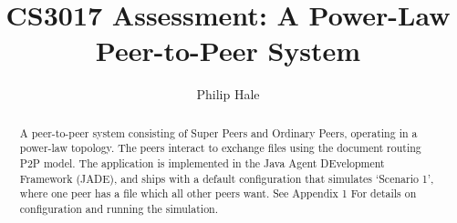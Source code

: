 \documentclass[a4paper,oneside]{article}
\author{Philip Hale}
\title{CS3017 Assessment: A Power-Law Peer-to-Peer System}
\begin{document}
\begin{titlepage}
  \maketitle
  \begin{abstract}
  A peer-to-peer system consisting of Super Peers and Ordinary Peers, operating
  in a power-law topology. The peers interact to exchange files using the
  document routing P2P model. The application is implemented in the Java Agent
  DEvelopment Framework (JADE), and ships with a default configuration that
  simulates `Scenario 1', where one peer has a file which all other peers want.
  See Appendix 1 For details on configuration and running the simulation.
  \end{abstract}
  \dosecttoc
  \tableofcontents
\end{titlepage}




\end{document}
